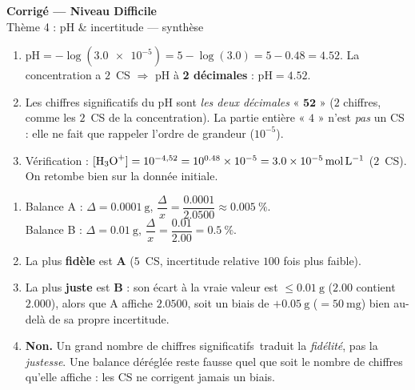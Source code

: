 \documentclass[11pt,a4paper]{article}
\newcommand{\CS}{chiffres significatifs}
\begin{document}
\begin{center}
{\Large\bfseries\color{primarydark} Corrigé — Niveau Difficile}\\[1pt]
{\color{primary} Thème 4 : pH \& incertitude — synthèse}
\end{center}
\vspace{2mm}

\begin{cor}
\begin{enumerate}[label=\alph*),leftmargin=1.6em,itemsep=1pt]
  \item $\mathrm{pH}=-\log(\num{3,0e-5})=5-\log(\num{3,0})=5-\num{0,48}=\num{4,52}$. La concentration
        a $2$~CS $\Rightarrow$ pH à \textbf{2 décimales} : $\boxed{\mathrm{pH}=\num{4,52}}$.
  \item Les chiffres significatifs du pH sont \emph{les deux décimales} « $\mathbf{52}$ » ($2$ chiffres,
        comme les $2$~CS de la concentration). La partie entière « $4$ » n'est \emph{pas} un CS : elle
        ne fait que rappeler l'ordre de grandeur ($10^{-5}$).
  \item Vérification : $[\ce{H3O+}]=10^{-4,52}=10^{\num{0,48}}\times10^{-5}=\num{3,0e-5}\,\si{\mol\per\litre}$
        ($2$~CS). On retombe bien sur la donnée initiale.
\end{enumerate}
\end{cor}

\begin{cor}
\begin{enumerate}[label=\alph*),leftmargin=1.6em,itemsep=1pt]
  \item Balance A : $\Delta=\qty{0,0001}{\gram}$, $\dfrac{\Delta}{x}=\dfrac{\num{0,0001}}{\num{2,0500}}
        \approx\qty{0,005}{\percent}$. \\
        Balance B : $\Delta=\qty{0,01}{\gram}$, $\dfrac{\Delta}{x}=\dfrac{\num{0,01}}{\num{2,00}}
        =\qty{0,5}{\percent}$.
  \item La plus \textbf{fidèle} est \textbf{A} ($5$~CS, incertitude relative $100$ fois plus faible).
  \item La plus \textbf{juste} est \textbf{B} : son écart à la vraie valeur est $\le\qty{0,01}{\gram}$
        ($\num{2,00}$ contient $\num{2,000}$), alors que A affiche $\num{2,0500}$, soit un biais de
        $+\qty{0,05}{\gram}$ ($=\qty{50}{\milli\gram}$) bien au-delà de sa propre incertitude.
  \item \textbf{Non.} Un grand nombre de \CS\ traduit la \emph{fidélité}, pas la \emph{justesse}. Une
        balance déréglée reste fausse quel que soit le nombre de chiffres qu'elle affiche : les CS ne
        corrigent jamais un biais.
\end{enumerate}
\end{cor}
\end{document}
